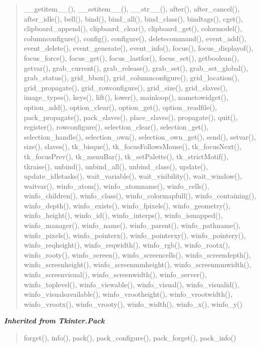 \begin{quote}
\_\_getitem\_\_(), \_\_setitem\_\_(), \_\_str\_\_(), after(), after\_cancel(), after\_idle(), bell(), bind(), bind\_all(), bind\_class(), bindtags(), cget(), clipboard\_append(), clipboard\_clear(), clipboard\_get(), colormodel(), columnconfigure(), config(), configure(), deletecommand(), event\_add(), event\_delete(), event\_generate(), event\_info(), focus(), focus\_displayof(), focus\_force(), focus\_get(), focus\_lastfor(), focus\_set(), getboolean(), getvar(), grab\_current(), grab\_release(), grab\_set(), grab\_set\_global(), grab\_status(), grid\_bbox(), grid\_columnconfigure(), grid\_location(), grid\_propagate(), grid\_rowconfigure(), grid\_size(), grid\_slaves(), image\_types(), keys(), lift(), lower(), mainloop(), nametowidget(), option\_add(), option\_clear(), option\_get(), option\_readfile(), pack\_propagate(), pack\_slaves(), place\_slaves(), propagate(), quit(), register(), rowconfigure(), selection\_clear(), selection\_get(), selection\_handle(), selection\_own(), selection\_own\_get(), send(), setvar(), size(), slaves(), tk\_bisque(), tk\_focusFollowsMouse(), tk\_focusNext(), tk\_focusPrev(), tk\_menuBar(), tk\_setPalette(), tk\_strictMotif(), tkraise(), unbind(), unbind\_all(), unbind\_class(), update(), update\_idletasks(), wait\_variable(), wait\_visibility(), wait\_window(), waitvar(), winfo\_atom(), winfo\_atomname(), winfo\_cells(), winfo\_children(), winfo\_class(), winfo\_colormapfull(), winfo\_containing(), winfo\_depth(), winfo\_exists(), winfo\_fpixels(), winfo\_geometry(), winfo\_height(), winfo\_id(), winfo\_interps(), winfo\_ismapped(), winfo\_manager(), winfo\_name(), winfo\_parent(), winfo\_pathname(), winfo\_pixels(), winfo\_pointerx(), winfo\_pointerxy(), winfo\_pointery(), winfo\_reqheight(), winfo\_reqwidth(), winfo\_rgb(), winfo\_rootx(), winfo\_rooty(), winfo\_screen(), winfo\_screencells(), winfo\_screendepth(), winfo\_screenheight(), winfo\_screenmmheight(), winfo\_screenmmwidth(), winfo\_screenvisual(), winfo\_screenwidth(), winfo\_server(), winfo\_toplevel(), winfo\_viewable(), winfo\_visual(), winfo\_visualid(), winfo\_visualsavailable(), winfo\_vrootheight(), winfo\_vrootwidth(), winfo\_vrootx(), winfo\_vrooty(), winfo\_width(), winfo\_x(), winfo\_y()
\end{quote}

\large{\textbf{\textit{Inherited from Tkinter.Pack}}}

\begin{quote}
forget(), info(), pack(), pack\_configure(), pack\_forget(), pack\_info()
\end{quote}

